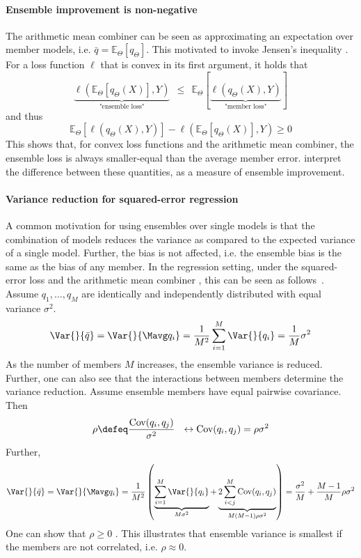 \documentclass[
    a4paper, %
	fontsize=10pt, %
	twoside=false, %
]{kaobook}
\begin{document}
\paragraph{Ensemble improvement is non-negative} The arithmetic mean combiner can be seen as approximating an expectation over member models, i.e. $\bar{q} = \mathbb{E}_{\Theta} \left[q_{\Theta}\right]$.
This motivated  to invoke Jensen's inequality
. For a loss function $\ell$ that is convex in its first argument, it holds that
$$
\underbrace{
\ell(\mathbb{E}_{\Theta}\left[ q_{\Theta}(X)\right] , Y  ) 
}_{\text{"ensemble loss"}}
~ ~ \leq ~ ~ 
\mathbb{E}_{\Theta}\left[ 
\underbrace{
\ell(q_{\Theta}(X), Y)  
}_{\text{"member loss"}}
\right]
$$
and thus
$$
\mathbb{E}_{{\Theta}}\left[ \ell (q_{\Theta}(X),Y) \right]  -
\ell(\mathbb{E}_{\Theta}\left[ q_{\Theta}(X) \right] ,Y ) \geq 0
$$
This shows that, for convex loss functions and the arithmetic mean combiner, the ensemble loss is always smaller-equal than the average member error.
 interpret the difference between these quantities, as a measure of ensemble improvement. 

\paragraph{Variance reduction for squared-error regression} 
A common motivation for using ensembles over single models is that the combination of models reduces the variance as compared to the expected variance of a single model. Further, the bias is not affected, i.e. the ensemble bias is the same as the bias of any member.
In the regression setting, under the squared-error loss and the arithmetic mean combiner%
, this can be seen as follows~\cite{stackexchange}. Assume $q_{1}, \dots, q_{M}$ are identically and independently distributed with equal variance $\sigma^2$.
$$
	\Var{}{\bar{q}} = \Var{}{\Mavg q_{i}} = \frac{1}{M^2} \sum_{i=1}^M \Var{}{q_{i}} = \frac{1}{M} \sigma^2
$$
As the number of members $M$ increases, the ensemble variance is reduced. Further, one can also see that the interactions between members determine the variance reduction. Assume ensemble members have equal pairwise covariance. Then 
$$
\rho \defeq \frac{\text{Cov}(q_{i}, q_{j})}{\sigma^2} ~ ~ \leftrightarrow \text{Cov}(q_{i}, q_{j}) = \rho \sigma^2
$$
Further, 
$$
\Var{}{\bar{q}} = \Var{}{\Mavg q_{i}} = \frac{1}{M^2} \left( 
\underbrace{
\sum_{i=1}^M \Var{}{q_{i}}
}_{M\sigma^2}
+
\underbrace{
2 \sum_{i<j}^M \text{Cov}(q_{i}, q_{j})
}_{M(M-1)\rho \sigma^2}
\right)
= \frac{\sigma^2}{M} + \frac{M-1}{M} \rho \sigma^2
$$
One can show that $\rho \geq 0$ \cite{louppe_UnderstandingRandomForests_2015}. This illustrates that ensemble variance is smallest if the members are not correlated, i.e. $\rho \approx 0$. 
\end{document}
